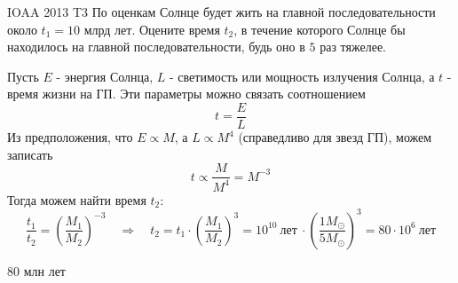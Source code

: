 \begin{problem}{IOAA 2013 T3} 
	По оценкам Солнце будет жить на главной последовательности около $t_1=10$ млрд лет. Оцените время $t_2$, в течение которого Солнце бы находилось на главной последовательности, будь оно в $5$ раз тяжелее.

\begin{solution}
	Пусть $E$ - энергия Солнца, $L$ - светимость или мощность излучения Солнца, а $t$ - время жизни на ГП. Эти параметры можно связать соотношением
    \begin{equation}
        t=\frac{E}{L}
    \end{equation}
    Из предположения, что $E\propto M$, а $L\propto M^4$ (справедливо для звезд ГП), можем записать
    \begin{equation}
        t\propto\frac{M}{M^4}=M^{-3}
    \end{equation}
    Тогда можем найти время $t_2$:
    \begin{equation}
        \frac{t_1}{t_2}=\left(\frac{M_1}{M_2}\right)^{-3} \quad\Longrightarrow\quad t_2=t_1\cdot\left(\frac{M_1}{M_2}\right)^3=10^{10}~\text{лет}~\cdot\left(\frac{1M_{\odot}}{5M_{\odot}}\right)^3=80\cdot 10^6~\text{лет}
    \end{equation}
\end{solution}

\begin{answer}
	$80$ млн лет
\end{answer}
\end{problem}